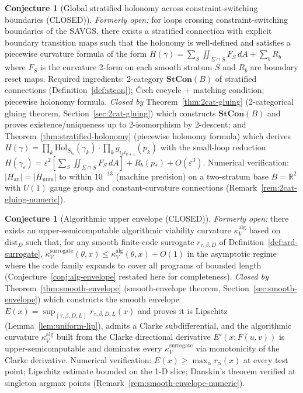 \documentclass[11pt,a4paper]{article}
\theoremstyle{plain}
\theoremstyle{definition}
\newtheorem{conjecture}[theorem]{Conjecture}
\theoremstyle{remark}
\newcommand{\kk}{\kappa_{\!V}}
\newcommand{\RR}{\mathbb{R}}
\newcommand{\distD}{\mathrm{dist}_{D}}
\begin{document}
\begin{conjecture}[Global stratified holonomy across constraint-switching
boundaries (CLOSED)]\label{conj:global-stratified-holonomy}
\emph{Formerly open:} for loops crossing constraint-switching boundaries
of the SAVGS, there exists a stratified connection with explicit
boundary transition maps such that the holonomy is well-defined and
satisfies a piecewise curvature formula of the form $H(\gamma) =
\sum_S \iint_{\Sigma \cap S} F_S\,dA + \sum_b R_b$ where $F_S$ is the
curvature 2-form on each smooth stratum $S$ and $R_b$ are boundary
reset maps. Required ingredients: 2-category $\mathbf{StCon}(B)$ of
stratified connections (Definition~\ref{def:stcon}); Čech cocycle +
matching condition; piecewise holonomy formula.
\emph{Closed by} Theorem~\ref{thm:2cat-gluing} (2-categorical gluing
theorem, Section~\ref{sec:2cat-gluing}) which constructs
$\mathbf{StCon}(B)$ and proves existence/uniqueness up to 2-isomorphism
by 2-descent; and Theorem~\ref{thm:stratified-holonomy} (piecewise
holonomy formula) which derives $H(\gamma) = \prod_k
\mathrm{Hol}_{S_{i_k}}(\gamma_k) \cdot \prod_k g_{i_k i_{k+1}}(p_k)$
with the small-loop reduction $H(\gamma_\varepsilon) = \varepsilon^2
[\sum_S \iint_{\Sigma \cap S} F_S\, dA] + R_b(p_*) + O(\varepsilon^3)$.
Numerical verification: $|H_{\mathrm{an}}| = |H_{\mathrm{num}}|$ to
within $10^{-13}$ (machine precision) on a two-stratum base $B = \RR^2$
with $U(1)$ gauge group and constant-curvature connections
(Remark~\ref{rem:2cat-gluing-numeric}).
\end{conjecture}

\begin{conjecture}[Algorithmic upper envelope (CLOSED)]
\label{conj:alg-envelope-restate}
\emph{Formerly open:} there exists an upper-semicomputable algorithmic
viability curvature $\kk^{\mathrm{alg}}$ based on $\distD$ such that,
for any smooth finite-code surrogate $r_{\tau, \beta, D}$ of
Definition~\ref{def:ard-surrogate}, $\kk^{\mathrm{surrogate}}(\theta,
x) \leq \kk^{\mathrm{alg}}(\theta, x) + O(1)$ in the asymptotic regime
where the code family expands to cover all programs of bounded length
(Conjecture~\ref{conj:alg-envelope} restated here for completeness).
\emph{Closed by} Theorem~\ref{thm:smooth-envelope} (smooth-envelope
theorem, Section~\ref{sec:smooth-envelope}) which constructs the smooth
envelope $E(x) = \sup_{(\tau, \beta, D, L)} r_{\tau, \beta, D, L}(x)$
and proves it is Lipschitz (Lemma~\ref{lem:uniform-lip}), admits a
Clarke subdifferential, and the algorithmic curvature
$\kk^{\mathrm{alg}}$ built from the Clarke directional derivative
$E'(x; F(u, v))$ is upper-semicomputable and dominates every
$\kk^{\mathrm{surrogate}}$ via monotonicity of the Clarke derivative.
Numerical verification: $E(x) \geq \max_\alpha r_\alpha(x)$ at every
test point; Lipschitz estimate bounded on the 1-D slice; Danskin's
theorem verified at singleton argmax points
(Remark~\ref{rem:smooth-envelope-numeric}).
\end{conjecture}
\end{document}
